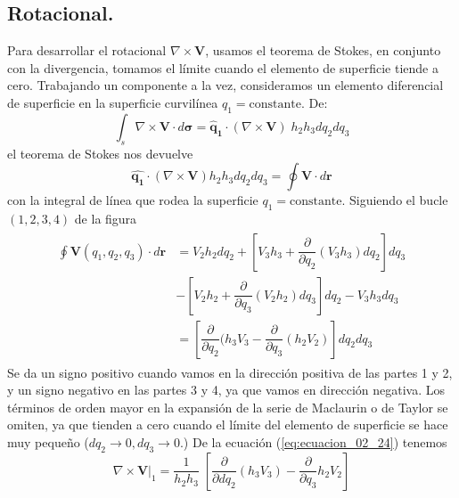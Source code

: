 \subsection{Rotacional.}
Para desarrollar el rotacional $\nabla \times \mathbf{V}$, usamos el teorema de Stokes, en conjunto con la divergencia, tomamos el límite cuando el elemento de superficie tiende a cero. Trabajando un componente a la vez, consideramos un elemento diferencial de superficie en la superficie curvilínea $q_{1} = \text{constante}$. De:
\begin{equation}
\int_{s} \nabla \times \mathbf{V} \cdot d \bm{\sigma} = \mathbf{\widehat{q}_{1}} \cdot \left( \nabla \times \mathbf{V} \right) \; h_{2} h_{3} dq_{2} dq_{3}
\label{eq:ecuacion_02_23}
\end{equation}
el teorema de Stokes nos devuelve
\begin{equation}
\mathbf{\widehat{q_{1}}} \cdot \left( \nabla \times \mathbf{V} \right) h_{2} h_{3} dq_{2} dq_{3} = \oint \mathbf{V} \cdot d \mathbf{r}
\label{eq:ecuacion_02_24}
\end{equation}
con la integral de línea que rodea la superficie $q_{1}=\text{constante}$. Siguiendo el bucle $(1,2,3,4)$ de la figura
\begin{eqnarray}
\begin{aligned}
\oint \mathbf{V}(q_{1},q_{2},q_{3}) \cdot d \mathbf{r} &= V_{2} h_{2} dq_{2} + \left[ V_{3} h_{3} + \dfrac{\partial}{\partial q_{2}} (V_{3} h_{3}) dq_{2} \right] dq_{3} \\
&- \left[ V_{2} h_{2} + \dfrac{\partial}{\partial q_{3}} (V_{2} h_{2}) dq_{3} \right] dq_{2} - V_{3} h_{3} dq_{3} \\
&= \left[ \dfrac{\partial}{\partial q_{2}} (h_{3} V_{3} - \dfrac{\partial}{\partial q_{3}} (h_{2} V_{2}) \right] dq_{2} dq_{3}
\end{aligned}
\label{eq:ecuacion_02_25}
\end{eqnarray}
Se da un signo positivo cuando vamos en la dirección positiva de las partes 1 y 2, y un signo negativo en las partes 3 y 4, ya que vamos en dirección negativa. Los términos de orden mayor en la expansión de la serie de Maclaurin o de Taylor se omiten, ya que tienden a cero cuando el límite del elemento de superficie se hace muy pequeño ($dq_{2} \rightarrow 0, dq_{3} \rightarrow 0$.)
De la ecuación (\ref{eq:ecuacion_02_24}) tenemos
\begin{equation}
\nabla \times \mathbf{V} \big\vert_{1} = \dfrac{1}{h_{2}h_{3}} \; \left[ \dfrac{\partial}{\partial dq_{2}} (h_{3} V_{3}) - \dfrac{\partial}{\partial q_{3}} h_{2}V_{2} \right]
\label{eq:ecuacion_02_26}
\end{equation}

